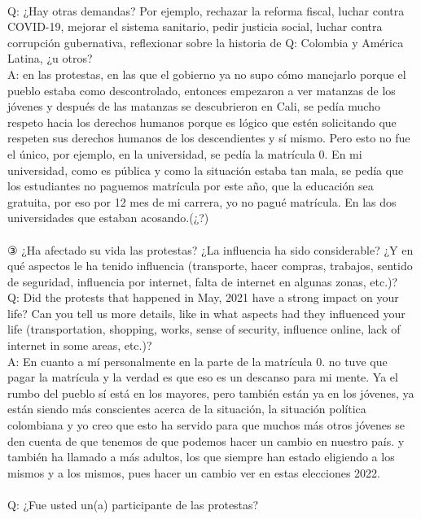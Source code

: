 \documentclass{phyasgn}\usepackage{nag}
\begin{document}
\\
Q: ¿Hay otras demandas? Por ejemplo, rechazar la reforma fiscal, luchar contra COVID-19, mejorar el sistema sanitario, pedir justicia social, luchar contra corrupción gubernativa, reflexionar sobre la historia de Q: Colombia y América Latina, ¿u otros?\\
A: en las protestas, en las que el gobierno ya no supo cómo manejarlo porque el pueblo estaba como descontrolado, entonces empezaron a ver matanzas de los jóvenes y después de las matanzas se descubrieron en Cali, se pedía mucho respeto hacia los derechos humanos porque es lógico que estén solicitando que respeten sus derechos humanos de los descendientes y sí mismo. Pero esto no fue el único, por ejemplo, en la universidad, se pedía la matrícula 0. En mi universidad, como es pública y como la situación estaba tan mala, se pedía que los estudiantes no paguemos matrícula por este año, que la educación sea gratuita, por eso por 12 mes de mi carrera, yo no pagué matrícula. En las dos universidades que estaban acosando.(¿?)\\
\\
③ ¿Ha afectado su vida las protestas? ¿La influencia ha sido considerable? ¿Y en qué aspectos le ha tenido influencia (transporte, hacer compras, trabajos, sentido de seguridad, influencia por internet, falta de internet en algunas zonas, etc.)?\\
	Q: Did the protests that happened in May, 2021 have a strong impact on your life? Can you tell us more details, like in what aspects had they influenced your life (transportation, shopping, works, sense of security, influence online, lack of internet in some areas, etc.)?\\
A: En cuanto a mí personalmente en la parte de la matrícula 0. no tuve que pagar la matrícula y la verdad es que eso es un descanso para mi mente. Ya el rumbo del pueblo sí está en los mayores, pero también están ya en los jóvenes, ya están siendo más conscientes acerca de la situación, la situación política colombiana y yo creo que esto ha servido para que muchos más otros jóvenes se den cuenta de que tenemos de que podemos hacer un cambio en nuestro país. y también ha llamado a más adultos, los que siempre han estado eligiendo a los mismos y a los mismos, pues hacer un cambio ver en estas elecciones 2022. \\
\\
Q: ¿Fue usted un(a) participante de las protestas?\\
\end{document}
